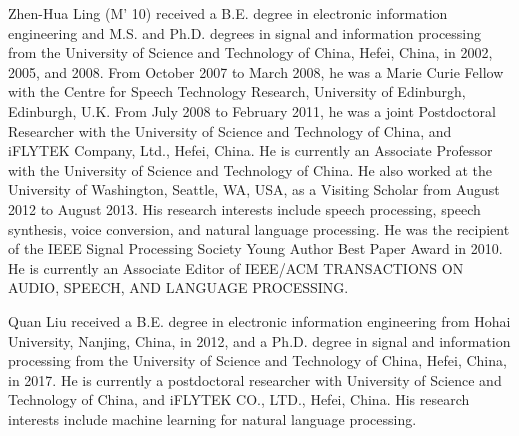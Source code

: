 \documentclass[journal]{IEEEtran}
\begin{document}
\begin{IEEEbiography}{Zhen-Hua Ling}
  (M' 10) received a B.E. degree in electronic information engineering and M.S. and Ph.D. degrees in signal and information processing from the University of Science and Technology of China, Hefei, China, in 2002, 2005, and 2008. From October 2007 to March 2008, he was a Marie Curie Fellow with the Centre for Speech Technology Research, University of Edinburgh, Edinburgh, U.K. From July 2008 to February 2011, he was a joint Postdoctoral Researcher with the University of Science and Technology of China, and iFLYTEK Company, Ltd., Hefei, China. He is currently an Associate Professor with the University of Science and Technology of China. He also worked at the University of Washington, Seattle, WA, USA, as a Visiting Scholar from August 2012 to August 2013. His research interests include speech processing, speech synthesis, voice conversion, and natural language processing. He was the recipient of the IEEE Signal Processing Society Young Author Best Paper Award in 2010. He is currently an Associate Editor of IEEE/ACM TRANSACTIONS ON AUDIO, SPEECH, AND LANGUAGE PROCESSING.
\end{IEEEbiography}

\begin{IEEEbiography}{Quan Liu}
  received a B.E. degree in electronic information engineering from Hohai University, Nanjing, China, in 2012, and a Ph.D. degree in signal and information processing from the University of Science and Technology of China, Hefei, China, in 2017.
  He is currently a postdoctoral researcher with University of Science and Technology of China, and iFLYTEK CO., LTD., Hefei, China.
  His research interests include machine learning for natural language processing.
\end{IEEEbiography}
\end{document}
